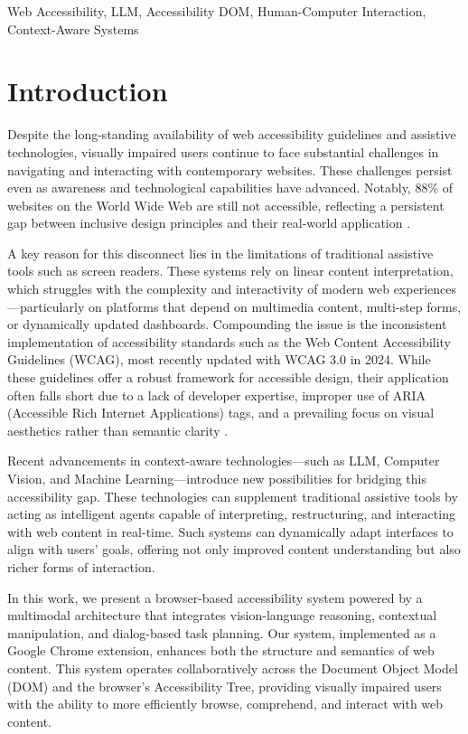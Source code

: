 \documentclass[conference]{IEEEtran}
\begin{document}
\begin{IEEEkeywords}
Web Accessibility, LLM, Accessibility DOM, Human-Computer Interaction, Context-Aware Systems
\end{IEEEkeywords}

\section{Introduction}\label{intro}

Despite the long-standing availability of web accessibility guidelines and assistive technologies, visually impaired users continue to face substantial challenges in navigating and interacting with contemporary websites. These challenges persist even as awareness and technological capabilities have advanced. Notably, 88\% of websites on the World Wide Web are still not accessible, reflecting a persistent gap between inclusive design principles and their real-world application \cite{webaccess2024}.

A key reason for this disconnect lies in the limitations of traditional assistive tools such as screen readers. These systems rely on linear content interpretation, which struggles with the complexity and interactivity of modern web experiences—particularly on platforms that depend on multimedia content, multi-step forms, or dynamically updated dashboards. Compounding the issue is the inconsistent implementation of accessibility standards such as the Web Content Accessibility Guidelines (WCAG), most recently updated with WCAG 3.0 in 2024. While these guidelines offer a robust framework for accessible design, their application often falls short due to a lack of developer expertise, improper use of ARIA (Accessible Rich Internet Applications) tags, and a prevailing focus on visual aesthetics rather than semantic clarity \cite{gbd2021, wcagchallenges2025}.

Recent advancements in context-aware technologies—such as LLM, Computer Vision, and Machine Learning—introduce new possibilities for bridging this accessibility gap. These technologies can supplement traditional assistive tools by acting as intelligent agents capable of interpreting, restructuring, and interacting with web content in real-time. Such systems can dynamically adapt interfaces to align with users' goals, offering not only improved content understanding but also richer forms of interaction.

In this work, we present a browser-based accessibility system powered by a multimodal architecture that integrates vision-language reasoning, contextual manipulation, and dialog-based task planning. Our system, implemented as a Google Chrome extension, enhances both the structure and semantics of web content. This system operates collaboratively across the Document Object Model (DOM) and the browser's Accessibility Tree, providing visually impaired users with the ability to more efficiently browse, comprehend, and interact with web content.
\end{document}
